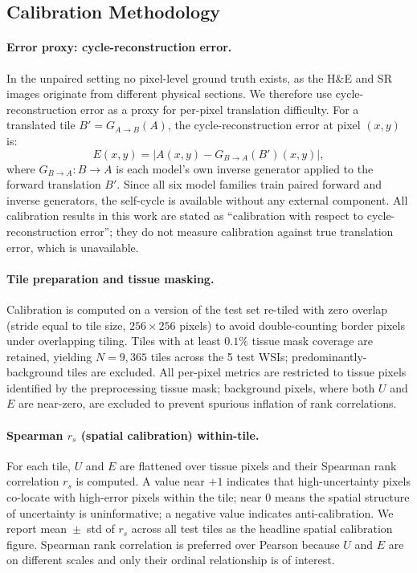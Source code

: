 \subsection{Calibration Methodology}
\label{sec:supp-unc-calibration}

\paragraph{Error proxy: cycle-reconstruction error.}
In the unpaired setting no pixel-level ground truth exists, as the H\&E and SR
images originate from different physical sections.
We therefore use cycle-reconstruction error as a proxy for per-pixel translation
difficulty.
For a translated tile $B' = G_{A \to B}(A)$, the cycle-reconstruction error at
pixel $(x, y)$ is:
\begin{equation}
  E(x, y) = \bigl|A(x, y) - G_{B \to A}(B')(x, y)\bigr|,
\end{equation}
where $G_{B \to A}\colon B \to A$ is each model's own inverse generator applied to
the forward translation $B'$.
Since all six model families train paired forward and inverse generators, the
self-cycle is available without any external component.
All calibration results in this work are stated as ``calibration with respect to
cycle-reconstruction error''; they do not measure calibration against true
translation error, which is unavailable.

\paragraph{Tile preparation and tissue masking.}
Calibration is computed on a version of the test set re-tiled with zero overlap
(stride equal to tile size, $256{\times}256$ pixels) to avoid double-counting
border pixels under overlapping tiling.
Tiles with at least $0.1\%$ tissue mask coverage are retained, yielding
$N{=}9{,}365$ tiles across the 5 test WSIs; predominantly-background tiles are
excluded.
All per-pixel metrics are restricted to tissue pixels identified by the
preprocessing tissue mask; background pixels, where both $U$ and $E$ are
near-zero, are excluded to prevent spurious inflation of rank correlations.

\paragraph{Spearman $r_s$ (spatial calibration) within-tile.}
For each tile, $U$ and $E$ are flattened over tissue pixels and their Spearman rank
correlation $r_s$ is computed.
A value near $+1$ indicates that high-uncertainty pixels co-locate with high-error
pixels within the tile; near $0$ means the spatial structure of uncertainty is
uninformative; a negative value indicates anti-calibration.
We report mean~$\pm$~std of $r_s$ across all test tiles as the headline spatial
calibration figure.
Spearman rank correlation is preferred over Pearson because $U$ and $E$ are on
different scales and only their ordinal relationship is of interest.

